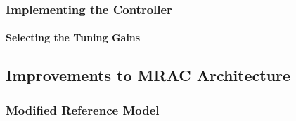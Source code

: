 \subsubsection{Implementing the Controller}


\paragraph{Selecting the Tuning Gains}

\subsection{Improvements to MRAC Architecture}

\subsubsection{Modified Reference Model}

